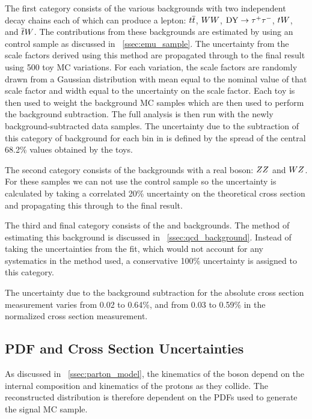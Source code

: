 The first category consists of the various backgrounds with two independent
decay chains each of which can produce a lepton: $t\overline{t}$, $WW$,
$\text{DY} \to \tau^{+} \tau^{-}$, $tW$, and $\overline{t}W$. The contributions from these backgrounds
are estimated by using an \emu control sample as discussed in
\SEC~\ref{ssec:emu_sample}. The uncertainty from the scale factors derived
using this method are propagated through to the final result using 500 toy MC
variations. For each variation, the scale factors are randomly drawn from a
Gaussian distribution with mean equal to the nominal value of that scale factor
and width equal to the uncertainty on the scale factor. Each toy is then used
to weight the background MC samples  which are then used to perform the
background subtraction. The full analysis is then run with the newly
background-subtracted data samples. The uncertainty due to the subtraction of
this category of background for each bin in \phistar is defined by the spread
of the central 68.2\% values obtained by the toys.

The second category consists of the backgrounds with a real \Z boson: $ZZ$
and $WZ$. For these samples we can not use the \emu control sample so the
uncertainty is calculated by taking a correlated 20\% uncertainty on the
theoretical cross section and propagating this through to the final result.

The third and final category consists of the \QCDjets and \wjets
backgrounds. The method of estimating this background is discussed in
\SEC~\ref{ssec:qcd_background}. Instead of taking the uncertainties from the
fit, which would not account for any systematics in the method used, a
conservative 100\% uncertainty is assigned to this category.

The uncertainty due to the background subtraction for the absolute cross
section measurement varies from 0.02 to 0.64\%, and from 0.03 to 0.59\% in the
normalized cross section measurement.

\subsection{PDF and Cross Section Uncertainties}
\label{ssec:pdf_uncertainties}

As discussed in \SEC~\ref{ssec:parton_model}, the kinematics of the \Z boson
depend on the internal composition and kinematics of the protons as they
collide. The reconstructed \phistar distribution is therefore dependent on the
PDFs used to generate the signal MC sample.

